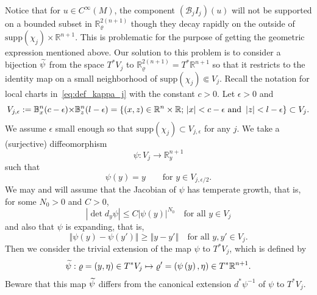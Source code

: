 \documentclass[AHL,Unicode,longabstracts,published]{cedram}
\newcommand{\clB}{\mathcal{B}}
\newcommand{\supp}{\mathrm{supp}}
\newcommand{\bbR}{\mathbb{R}}
\newcommand{\bbB}{\mathbb{B}}
\let\oldtilde\tilde
\renewcommand*{\tilde}[1]{\mathchoice{\widetilde{#1}}{\widetilde{#1}}{\oldtilde{#1}}{\oldtilde{#1}}}
\newcommand{\bbR}{\mathbb{R}}
\begin{document}
Notice that for $u\in C^{\infty}(M)$, the component $(\clB_{j}I_{j})(u)$ will not be supported on a bounded subset in $\bbR_{\varrho}^{2(n+1)}$ though they decay rapidly on the outside of $\supp(\chi_{j})\times\bbR^{n+1}$. This is problematic for the purpose of getting the geometric expression mentioned above. Our solution to this problem is to consider a bijection $\tilde{\psi}$ from the space $T^{*}V_{j}$ to $\bbR_{\varrho}^{2(n+1)}=T^{*}\bbR^{n+1}$ so that it restricts to the identity map on a small neighborhood of $\supp(\chi_{j})\Subset V_{j}$. Recall the notation for local charts in~\eqref{eq:def_kappa_j} with the constant $c>0$. Let $\epsilon>0$ and
\[
V_{j,\epsilon}:=\text{\ensuremath{\bbB_{x}^{n}(c-\epsilon)}\ensuremath{\times}}\ensuremath{\bbB_{z}^{n}(l-\epsilon)}=\left\{ \left(x,z\right)\in\bbR^{n}\times\bbR;\,\left|x\right|<c-\epsilon\text{ and }\left|z\right|<l-\epsilon\right\} \subset V_{j}.
\]
We assume $\epsilon$ small enough so that $\supp(\chi_{j})\subset V_{j,\epsilon}$ for any $j$. We take a (surjective) diffeomorphism
\begin{equation}\label{eq:def_psi}
\psi:V_{j}\rightarrow\bbR_{y}^{n+1}
\end{equation}
such that
\begin{equation}\label{eq:psi_y_y}
\psi\left(y\right)=y\qquad\text{for }y\in V_{j,\epsilon/2}.
\end{equation}
We may and will assume that the Jacobian of $\psi$ has temperate growth, that is, for some $N_{0}>0$ and $C>0$,
\[
\left|\det d_{y}\psi\right|\leq C\left|\psi\left(y\right)\right|^{N_{0}}\quad\text{for all }y\in V_{j}
\]
and also that $\psi$ is expanding, that is,
\begin{equation}\label{eq:expand}
\left\Vert \psi\left(y\right)-\psi\left(y'\right)\right\Vert \geq\left\Vert y-y'\right\Vert \quad\text{for all }y,y'\in V_{j}.
\end{equation}
Then we consider the trivial extension of the map $\psi$ to $T^{*}V_{j}$, which is defined by
\begin{equation}\label{eq:def_psi_tilde}
\tilde{\psi}:\varrho=\left(y,\eta\right)\in T^{*}V_{j}\mapsto\varrho'=\left(\psi\left(y\right),\eta\right)\in T^{*}\bbR^{n+1}.
\end{equation}
Beware that this map $\tilde{\psi}$ differs from the canonical extension $d^{*}\psi^{-1}$ of $\psi$ to $T^{*}V_{j}$.
\vspace*{-6pt}
\end{document}
